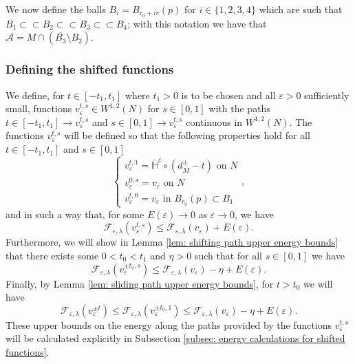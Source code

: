 \documentclass[11pt]{article}
\begin{document}
\bigskip

We now define the balls $B_i = B_{r_0 + ir}(p)$ for $i \in \{ 1,2,3,4\}$ which are such that $B_1 \subset \subset B_2 \subset \subset B_3 \subset \subset B_4$; with this notation we have that $\mathcal{A} = M \cap (\overline{B_3} \setminus B_2)$.


\subsubsection{Defining the shifted functions}\label{subsec: defining shifted functions}

We define, for $t \in [-t_1,t_1]$ where $t_1 > 0$ is to be chosen and all $\varepsilon > 0$ sufficiently small, functions $v^{t,s}_\varepsilon \in W^{1,2}(N)$ for $s \in [0,1]$ with the paths $t \in [-t_1,t_1] \rightarrow v^{t,s}_\varepsilon$ and $s \in [0,1] \rightarrow v^{t,s}_\varepsilon$ continuous in $W^{1,2}(N)$. The functions $v^{t,s}_\varepsilon$ will be defined so that the following properties hold for all $t \in [-t_1,t_1]$ and $s \in [0,1]$
\begin{equation}\label{eqn: properties of shifting functions}
    \begin{cases}
     v^{t,1}_\varepsilon = \overline{\mathbb{H}}^\varepsilon \circ ( d^\pm_{\overline{M}} - t) \text{ on } N\\
     v^{0,s}_\varepsilon = v_\varepsilon \text{ on } N\\
     v^{t,0}_\varepsilon = v_\varepsilon \text{ in } B_{r_0}(p) \subset B_1
    \end{cases},
\end{equation}
and in such a way that, for some $E(\varepsilon) \rightarrow 0$ as $\varepsilon \rightarrow 0$, we have
\begin{equation*}
    \mathcal{F}_{\varepsilon,\lambda}(v^{t,s}_\varepsilon) \leq \mathcal{F}_{\varepsilon,\lambda}(v_\varepsilon) + E(\varepsilon).
\end{equation*}
Furthermore, we will show in Lemma \ref{lem: shifting path upper energy bounds} that there exists some $0 < t_0 < t_1$ and $\eta > 0$ such that for all $s \in [0,1]$ we have
\begin{equation*}
\mathcal{F}_{\varepsilon,\lambda}(v^{\pm t_0,s}_\varepsilon) \leq \mathcal{F}_{\varepsilon,\lambda}(v_\varepsilon) - \eta + E(\varepsilon).    
\end{equation*}
Finally, by Lemma \ref{lem: sliding path upper energy bounds}, for $t > t_0$ we will have
\begin{equation*}
   \mathcal{F}_{\varepsilon,\lambda}(v^{\pm t}_\varepsilon) \leq \mathcal{F}_{\varepsilon,\lambda}(v^{\pm t_0,1}_\varepsilon) \leq \mathcal{F}_{\varepsilon,\lambda}(v_\varepsilon) - \eta + E(\varepsilon).
\end{equation*}
These upper bounds on the energy along the paths provided by the functions $v^{t,s}_\varepsilon$ will be calculated explicitly in Subsection \ref{subsec: energy calculations for shifted functions}.
\end{document}
